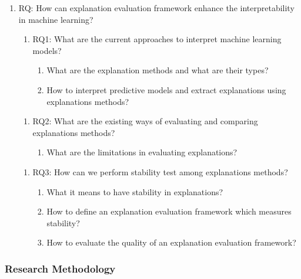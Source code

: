 \documentclass[english]{tktltiki2}
\theoremstyle{definition}
\theoremstyle{remark}
\begin{document}
\begin{enumerate}
	\item RQ: How can explanation evaluation framework enhance the interpretability in machine learning?
	
	\begin{enumerate}\addtocounter{enumii}{0}
		\item RQ1: What are the current approaches to interpret machine learning models?
		\begin{enumerate}
			\item What are the explanation methods and what are their types?
			\item How to interpret predictive models and extract explanations using  explanations methods?
		\end{enumerate}
	\end{enumerate}
	
	\begin{enumerate}\addtocounter{enumii}{1}
		\item RQ2: What are the existing ways of evaluating and comparing explanations methods?
		\begin{enumerate}
			\item What are the limitations in evaluating explanations?
		\end{enumerate}
	\end{enumerate}
	
	\begin{enumerate}\addtocounter{enumii}{2}
		\item RQ3: How can we perform stability test among explanations methods?
		\begin{enumerate}
			\item What it means to have stability in explanations?
			\item How to define an explanation evaluation framework which measures stability?
			\item How to evaluate the quality of an explanation evaluation framework?
		\end{enumerate}
	\end{enumerate}
\end{enumerate}
\subsubsection{Research Methodology} %
\end{document}
